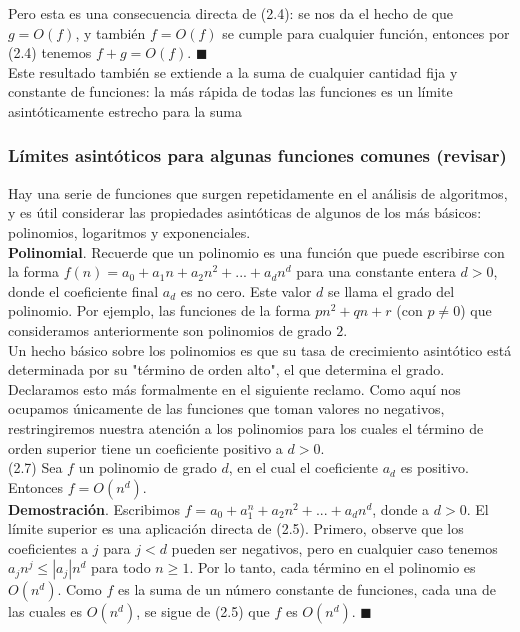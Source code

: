 \documentclass[a4paper]{article}
\begin{document}
Pero esta es una consecuencia directa de (2.4): se nos da el hecho de que $g = O (f)$, y también $f = O (f)$ se cumple para cualquier función, entonces por (2.4) tenemos $f + g = O (f)$. $\blacksquare$ \\

Este resultado también se extiende a la suma de cualquier cantidad fija y constante de funciones: la más rápida de todas las funciones es un límite asintóticamente estrecho para la suma\\

\subsubsection*{Límites asintóticos para algunas funciones comunes (revisar)}

Hay una serie de funciones que surgen repetidamente en el análisis de algoritmos, y es útil considerar las propiedades asintóticas de algunos de los más básicos: polinomios, logaritmos y exponenciales.\\

\textbf{Polinomial}. Recuerde que un polinomio es una función que puede escribirse con la forma $f(n) = a_0 + a_1n + a_2n^2 + ... + a_dn^d$ para una constante entera $d> 0$, donde el coeficiente final $a_d$ es no cero. Este valor $d$ se llama el grado del polinomio. Por ejemplo, las funciones de la forma $pn^2 + qn + r$ (con $p \neq 0$) que consideramos anteriormente son polinomios de grado $2$.\\

Un hecho básico sobre los polinomios es que su tasa de crecimiento asintótico está determinada por su "término de orden alto", el que determina el grado. Declaramos esto más formalmente en el siguiente reclamo. Como aquí nos ocupamos únicamente de las funciones que toman valores no negativos, restringiremos nuestra atención a los polinomios para los cuales el término de orden superior tiene un coeficiente positivo a $d>0$.\\

(2.7) Sea $f$ un polinomio de grado $d$, en el cual el coeficiente $a_d$ es positivo. Entonces $f = O (n^d)$.\\

\textbf{Demostración}. Escribimos $f = a_0 + a_1^n + a_2n^2 + ... + a_dn^d$, donde a $d>0$. El límite superior es una aplicación directa de (2.5). Primero, observe que los coeficientes a $j$ para $j<d$ pueden ser negativos, pero en cualquier caso tenemos $a_jn^j ≤ |a_j|n^d$ para todo $n≥1$. Por lo tanto, cada término en el polinomio es $O(n^d)$. Como $f$ es la suma de un número constante de funciones, cada una de las cuales es $O(n^d)$, se sigue de (2.5) que $f$ es $O(n^d)$. $\blacksquare$\\
\end{document}
